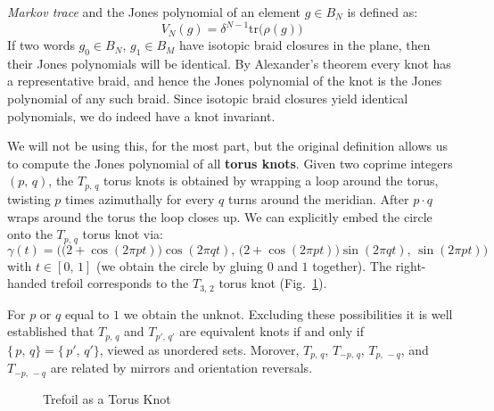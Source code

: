         \textit{Markov trace} and the Jones polynomial of an element
        $g\in{B}_{N}$ is defined as:
        \begin{equation}
            V_{N}(g)=\delta^{N-1}\textrm{tr}\big(\rho(g)\big)
        \end{equation}
        If two words $g_{0}\in{B}_{N}$, $g_{1}\in{B}_{M}$ have isotopic
        braid closures in the plane, then their Jones polynomials will be
        identical. By Alexander's theorem every knot has a
        representative braid, and hence the Jones polynomial of the knot is
        the Jones polynomial of any such braid. Since isotopic braid closures
        yield identical polynomials, we do indeed have a knot invariant.
        \par\hfill\par
        We will not be using this, for the most part, but the original
        definition allows us to compute the Jones polynomial of all
        \textbf{torus knots}. Given two coprime integers $(p,\,q)$, the
        $T_{p,\,q}$ torus knots is obtained by wrapping a loop around the
        torus, twisting $p$ times azimuthally for every $q$ turns around the
        meridian. After $p\cdot{q}$ wraps around the torus the loop closes
        up. We can explicitly embed the circle onto the $T_{p,\,q}$ torus knot
        via:
        \begin{equation}
            \gamma(t)=\Big(
                \big(2+\cos(2\pi{pt})\big)\cos(2\pi{qt}),\,
                \big(2+\cos(2\pi{pt})\big)\sin(2\pi{qt}),\,
                \sin(2\pi{pt})
            \Big)
        \end{equation}
        with $t\in[0,\,1]$
        (we obtain the circle by gluing $0$ and $1$ together). The right-handed
        trefoil corresponds to the $T_{3,\,2}$ torus knot
        (Fig.~\ref{fig:trefoil_2_3_torus_knot_on_torus}).
        \par\hfill\par
        For $p$ or $q$ equal to $1$ we obtain the unknot. Excluding these
        possibilities it is well established that
        $T_{p,\,q}$ and $T_{p',\,q'}$ are equivalent knots if and only if
        $\{\,p,\,q\}=\{\,p',\,q'\}$, viewed as unordered sets. Morover,
        $T_{p,\,q}$, $T_{-p,\,q}$, $T_{p,\,-q}$, and $T_{-p,\,-q}$ are related
        by mirrors and orientation reversals.
        \begin{figure}
            \centering
            \caption{Trefoil as a Torus Knot}
            \label{fig:trefoil_2_3_torus_knot_on_torus}
        \end{figure}
